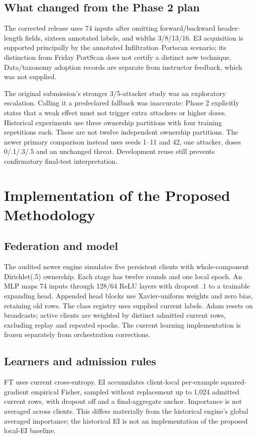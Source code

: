 \documentclass[10pt,a4paper]{article}
\begin{document}
\subsection{What changed from the Phase 2 plan}
The corrected release uses 74 inputs after omitting forward/backward header-length fields, sixteen annotated labels, and widths 3/8/13/16. E3 acquisition is supported principally by the annotated Infiltration--Portscan scenario; its distinction from Friday PortScan does not certify a distinct new technique. Data/taxonomy adoption records are separate from instructor feedback, which was not supplied.

The original submission's stronger 3/5-attacker study was an exploratory escalation. Calling it a predeclared fallback was inaccurate: Phase 2 explicitly states that a weak effect must not trigger extra attackers or higher doses. Historical experiments use three ownership partitions with four training repetitions each. These are not twelve independent ownership partitions. The newer primary comparison instead uses seeds 1--11 and 42, one attacker, doses 0/.1/.3/.5 and an unchanged threat. Development reuse still prevents confirmatory final-test interpretation.

\section{Implementation of the Proposed Methodology}
\subsection{Federation and model}
The audited newer engine simulates five persistent clients with whole-component Dirichlet(.5) ownership. Each stage has twelve rounds and one local epoch. An MLP maps 74 inputs through 128/64 ReLU layers with dropout .1 to a trainable expanding head. Appended head blocks use Xavier-uniform weights and zero bias, retaining old rows. The class registry uses supplied current labels. Adam resets on broadcasts; active clients are weighted by distinct admitted current rows, excluding replay and repeated epochs. The current learning implementation is frozen separately from orchestration corrections.

\subsection{Learners and admission rules}
FT uses current cross-entropy. EI accumulates client-local per-example squared-gradient empirical Fisher, sampled without replacement up to 1,024 admitted current rows, with dropout off and a final-aggregate anchor. Importance is not averaged across clients. This differs materially from the historical engine's global averaged importance; the historical EI is not an implementation of the proposed local-EI baseline.
\end{document}
